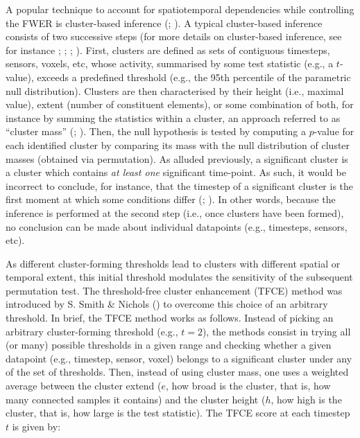 \documentclass[
  doc,
  floatsintext,
  longtable,
  a4paper,
  nolmodern,
  notxfonts,
  notimes,
  donotrepeattitle,
  colorlinks=true,linkcolor=blue,citecolor=blue,urlcolor=blue]{apa7}
\begin{document}
A popular technique to account for spatiotemporal dependencies while
controlling the FWER is cluster-based inference
(;
). A typical
cluster-based inference consists of two successive steps (for more
details on cluster-based inference, see for instance
;
; ; ). First, clusters are defined as sets of contiguous
timesteps, sensors, voxels, etc, whose activity, summarised by some test
statistic (e.g., a \(t\)-value), exceeds a predefined threshold (e.g.,
the 95th percentile of the parametric null distribution). Clusters are
then characterised by their height (i.e., maximal value), extent (number
of constituent elements), or some combination of both, for instance by
summing the statistics within a cluster, an approach referred to as
``cluster mass'' (;
). Then, the null
hypothesis is tested by computing a \(p\)-value for each identified
cluster by comparing its mass with the null distribution of cluster
masses (obtained via permutation). As alluded previously, a significant
cluster is a cluster which contains \emph{at least one} significant
time-point. As such, it would be incorrect to conclude, for instance,
that the timestep of a significant cluster is the first moment at which
some conditions differ (; ).
In other words, because the inference is performed at the second step
(i.e., once clusters have been formed), no conclusion can be made about
individual datapoints (e.g., timesteps, sensors, etc).

As different cluster-forming thresholds lead to clusters with different
spatial or temporal extent, this initial threshold modulates the
sensitivity of the subsequent permutation test. The threshold-free
cluster enhancement (TFCE) method was introduced by S. Smith \& Nichols
() to overcome this choice of an arbitrary
threshold. In brief, the TFCE method works as follows. Instead of
picking an arbitrary cluster-forming threshold (e.g., \(t=2\)), the
methods consist in trying all (or many) possible thresholds in a given
range and checking whether a given datapoint (e.g., timestep, sensor,
voxel) belongs to a significant cluster under any of the set of
thresholds. Then, instead of using cluster mass, one uses a weighted
average between the cluster extend (\(e\), how broad is the cluster,
that is, how many connected samples it contains) and the cluster height
(\(h\), how high is the cluster, that is, how large is the test
statistic). The TFCE score at each timestep \(t\) is given by:
\end{document}
